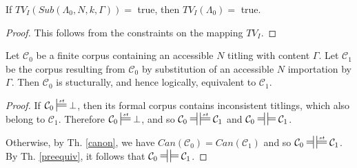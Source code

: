 \documentclass{IOS-Book-Article}
\newcommand{\corp}{ \mathcal{C} }
\newcommand{\ttl}{\mathit{ttl}}
\newcommand{\txt}{\mathit{txt}}
\newcommand{\Canon}{\mathit{Can}}
\newcommand{\TV}{\mathit{TV}}
\newcommand{\Sub}{\mathit{Sub}}
\newcommand{\mdpfEquiv}{\ensuremath{\ndststile[ss]{\hspace*{3 pt }}{}\hspace*{3 pt}\sdtstile[ss]{}{}}}
\newcommand{\mdpfstruct}{\ensuremath{\sdtstile[ss]{}{st}}}
\newcommand{\mdpfstructEquiv}{\ensuremath{\ndststile[ss]{\hspace*{3 pt }}{}\hspace*{3 pt}\sdtstile[ss]{}{st}}}
\newcommand{\mycomment}[1]{}
\begin{document}
{\begin{lem}
\label{replace2}
If $\TV_I(\Sub(\Lambda_0, N, k, \Gamma)) =$ true, then $\TV_I(\Lambda_0) =$ true.
\begin{proof}
This follows from the constraints on the mapping $\TV_I$.
\end{proof}
\end{lem}
}


\begin{theo}
\label{replace}
Let $\corp_0$ be a finite corpus containing an accessible $N$ titling with content $\Gamma$. 
Let $\corp_1$ be the corpus resulting from $\corp_0$ by substitution of an accessible $N$ importation by $\Gamma$.
Then $\corp_0$ is stucturally, and hence logically, equivalent to $\corp_1$.
\begin{proof}
If $\corp_0\mdpfstruct\bot$, then its formal corpus contains inconsistent titlings, which also belong to $\corp_1$. Therefore $\corp_0\mdpfstruct\bot$, and so $\corp_0\mdpfstructEquiv\corp_1$ and $\corp_0\mdpfEquiv\corp_1$.

Otherwise, by Th. \ref{canon}, we have $\Canon(\corp_0) = \Canon(\corp_1)$ and so $\corp_0\mdpfstructEquiv\corp_1$. By Th. \ref{preequiv}, it follows that $\corp_0\mdpfEquiv\corp_1$. 
\mycomment{ %
We first show that $\corp_0$ entails $\corp_1$. Let $I$ be a structural interpretation that satisfies $\corp_0$. Then $ttl_I(N)=\Gamma$. Therefore, $\corp_1$ is a subset of the importation closure of $\corp_0$ under $\ttl_I$, and by Lemma \ref{replace1}, $I$ satisfies $\corp_1$.

Next, we show that $\corp_1$ entails $\corp_0$.
Let $I$ be a structural interpretation that satisfies $\corp_1$.
Now any accessible titling in $\corp_0$ is also accessible in $\corp_1$, so $ttl_I(N)=\Gamma$.
Let $\Lambda_0$ be any text in $\corp_0 - \corp_1$. Then for some $m\ge 1$, $\Lambda_1 = \Sub(\Lambda_0, N, m, \Gamma)$ belongs to $\corp_1^I$ and so $\TV_I(\Lambda_1) =$ true. By Lemma \ref{replace2}, then $\TV_I(\Lambda_0)= $ true.}
\end{proof}  
\end{theo}

\mycomment{%
\begin{lem}
\label{delete1}
$\Gamma$ entails $\Sub(\Gamma, N, k, \txt)$ where $\txt$ is the empty text construction.
\begin{proof}
Let $I$ be any structural interpretation.
Let $\Gamma_1 = \Sub(\Gamma, N, k, \txt)$. Then $\TV_I(\Gamma)= \TV_I(\Gamma_1)$.
Reversing the substitution by replacing the $\txt$ occurrence with the original importation maps the importation closure of $\Gamma_1^I$ into $\Gamma^I$, with preservation of $\TV_I$.
Therefore, if $I$ satisfies $\Gamma$ it also satisfies $\Gamma_1$.
\end{proof}
\end{lem}
}
\end{document}
